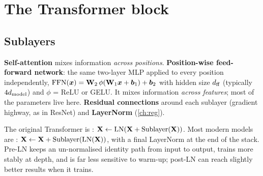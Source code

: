 \section{The Transformer block}

\subsection{Sublayers}
\begin{itemize}
	\ii \textbf{Self-attention} mixes information \emph{across positions}.
	\ii \textbf{Position-wise feed-forward network}: the same two-layer MLP applied to every position
	independently, $\operatorname{FFN}({\bm{x}})={\mathbf{W}}_2\,\phi({\mathbf{W}}_1{\bm{x}}+{\bm{b}}_1)+{\bm{b}}_2$ with hidden size $d_{\text{ff}}$ (typically
	$4d_{\text{model}}$) and $\phi$ = ReLU or GELU. It mixes information \emph{across features}; most of the
	parameters live here.
	\ii \textbf{Residual connections} around each sublayer (gradient highway, as in ResNet) and
	\textbf{LayerNorm} (\cref{ch:reg}).
\end{itemize}
The original Transformer is : ${\mathbf{X}}\gets\operatorname{LN}({\mathbf{X}}+\mathrm{Sublayer}({\mathbf{X}}))$. Most modern models
are : ${\mathbf{X}}\gets{\mathbf{X}}+\mathrm{Sublayer}(\operatorname{LN}({\mathbf{X}}))$, with a final LayerNorm at the end of the stack.
Pre-LN keeps an un-normalised identity path from input to output, trains more stably at depth, and is
far less sensitive to warm-up; post-LN can reach slightly better results when it trains.

